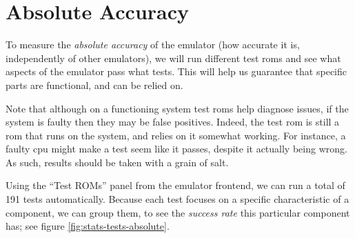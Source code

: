\documentclass[11pt]{report}
\begin{document}
\section{Absolute Accuracy}

To measure the \textit{absolute accuracy} of the emulator (how accurate it is, independently of other emulators), we will run different test \glspl{rom} and see what aspects of the emulator pass what tests. This will help us guarantee that specific parts are functional, and can be relied on.

Note that although on a functioning system test \glspl{rom} help diagnose issues, if the system is faulty then they may be false positives. Indeed, the test \gls{rom} is still a \gls{rom} that runs on the system, and relies on it somewhat working. For instance, a faulty \gls{cpu} might make a test seem like it passes, despite it actually being wrong. As such, results should be taken with a grain of salt.

Using the ``Test ROMs'' panel from the emulator frontend, we can run a total of 191 tests automatically. Because each test focuses on a specific characteristic of a component, we can group them, to see the \textit{success rate} this particular component has; see figure \ref{fig:stats-tests-absolute}.
\end{document}
